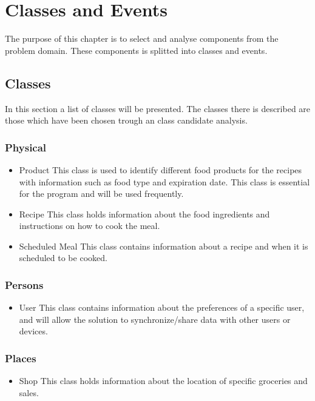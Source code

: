 \chapter{Classes and Events}
The purpose of this chapter is to select and analyse components from the problem domain. These components is splitted into classes and events.

\section{Classes}
In this section a list of classes will be presented. The classes there is described are those which have been chosen trough an class candidate analysis.

\subsection{Physical}
\begin{itemize}
\item Product
    \subitem This class is used to identify different food products for the recipes with information such as food type and expiration date. This class is essential for the program and will be used frequently.
\item Recipe
    \subitem This class holds information about the food ingredients and instructions on how to cook the meal.
\item Scheduled Meal
    \subitem This class contains information about a recipe and when it is scheduled to be cooked.
\end{itemize}

\subsection{Persons}
\begin{itemize}
\item User
    \subitem This class contains information about the preferences of a specific user, and will allow the solution to synchronize/share data with other users or devices.
\end{itemize}

\subsection{Places}
\begin{itemize}
\item Shop
    \subitem This class holds information about the location of specific groceries and sales.
\end{itemize}

